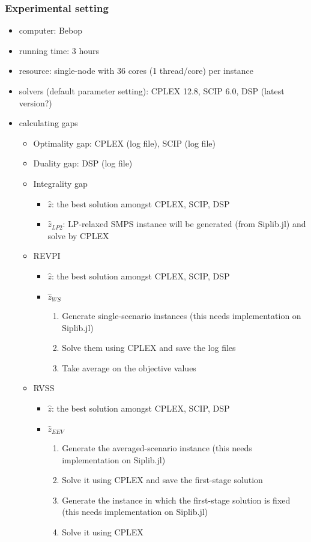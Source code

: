 \subsubsection{Experimental setting}
\begin{itemize}
	\item computer: Bebop
	\item running time: 3 hours
	\item resource: single-node with 36 cores (1 thread/core) per instance
	\item solvers (default parameter setting): CPLEX 12.8, SCIP 6.0, DSP \textcolor{NavyBlue}{(latest version?)}
	\item calculating gaps
		\begin{itemize}
			\item Optimality gap: CPLEX (log file), SCIP (log file)
			\item Duality gap: DSP (log file)
			\item Integrality gap
			\begin{itemize}
				\item $\hat{z}$: the best solution amongst CPLEX, SCIP, DSP
				\item $\hat{z}_{LP2}$: LP-relaxed SMPS instance will be generated (from Siplib.jl) and solve by CPLEX 
			\end{itemize}
			\item REVPI
			\begin{itemize}
				\item $\hat{z}$: the best solution amongst CPLEX, SCIP, DSP
				\item $\hat{z}_{WS}$
				\begin{enumerate}
					\item Generate single-scenario instances \textcolor{NavyBlue}{(this needs implementation on Siplib.jl)}
					\item Solve them using CPLEX and save the log files
					\item Take average on the objective values
				\end{enumerate}
			\end{itemize}
			\item RVSS
			\begin{itemize}
				\item $\hat{z}$: the best solution amongst CPLEX, SCIP, DSP
				\item $\hat{z}_{EEV}$
				\begin{enumerate}
					\item Generate the averaged-scenario instance \textcolor{NavyBlue}{(this needs implementation on Siplib.jl)}
					\item Solve it using CPLEX and \textcolor{NavyBlue}{save the first-stage solution}
					\item Generate the instance in which the first-stage solution is fixed \textcolor{NavyBlue}{(this needs implementation on Siplib.jl)}
					\item Solve it using CPLEX
				\end{enumerate}
			\end{itemize}
		\end{itemize}
\end{itemize}

